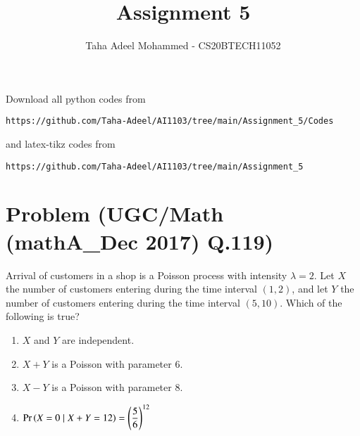 \documentclass[journal,12pt,twocolumn]{IEEEtran}
\begin{document}
     \def\rightbox#1{\makebox[0in][r]{#1}}
     \def\centbox#1{\makebox[0in]{#1}}
     \def\topbox#1{\raisebox{-\baselineskip}[0in][0in]{#1}}
     \def\midbox#1{\raisebox{-0.5\baselineskip}[0in][0in]{#1}}
\vspace{3cm}
\title{Assignment 5}
\author{Taha Adeel Mohammed - CS20BTECH11052}
\maketitle
\newpage
\bigskip
\renewcommand{\thefigure}{\theenumi}
\renewcommand{\thetable}{\theenumi}
Download all python codes from 
\begin{lstlisting}
https://github.com/Taha-Adeel/AI1103/tree/main/Assignment_5/Codes
\end{lstlisting}
%
and latex-tikz codes from 
%
\begin{lstlisting}
https://github.com/Taha-Adeel/AI1103/tree/main/Assignment_5
\end{lstlisting}
\section{Problem (UGC/Math (mathA\_Dec 2017) Q.119)}
Arrival of customers in a shop is a Poisson process with intensity $\lambda =2$. Let $X$ the number of customers entering during the time interval $(1,2)$, and let $Y$ the number of customers entering during the time interval $(5,10)$. Which of the following is true?
\begin{enumerate}[label=(\Alph*)]
    \item$X$ and $Y$ are independent.\\
    \item$X+Y$ is a Poisson with parameter $6$. \\
    \item$X-Y$ is a Poisson with parameter $8$.\\
    \item$\Pr\left(X=0\mid X+Y=12\right)=\left(\dfrac{5}{6}\right)^{12}$
\end{enumerate}
\end{document}
